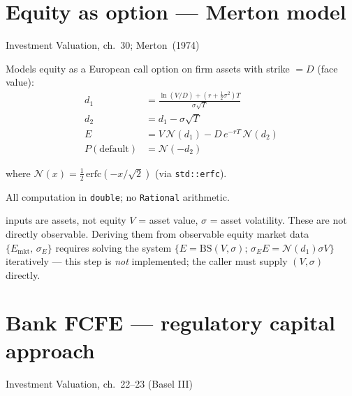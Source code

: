 \documentclass[11pt, a4paper, oneside]{article}
\begin{document}
\section{Equity as option --- Merton model}
\label{sec:distress}

\begin{damodaran}{Investment Valuation, ch.~30; Merton~(1974)}
\end{damodaran}

Models equity as a European call option on firm assets with strike $= D$ (face value):
\begin{align}
  d_1 &= \frac{\ln(V/D) + (r + \tfrac{1}{2}\sigma^2)T}{\sigma\sqrt{T}}
  \label{eq:d1}\\
  d_2 &= d_1 - \sigma\sqrt{T}
  \label{eq:d2}\\
  E &= V\,\mathcal{N}(d_1) - D\,e^{-rT}\,\mathcal{N}(d_2)
  \label{eq:merton_equity}\\
  P(\text{default}) &= \mathcal{N}(-d_2)
  \label{eq:pdefault}
\end{align}

where $\mathcal{N}(x) = \tfrac{1}{2}\,\mathrm{erfc}(-x/\sqrt{2})$
(via \texttt{std::erfc}).

All computation in \texttt{double}; no \texttt{Rational} arithmetic.

\begin{impl}{inputs are assets, not equity}
$V$ = asset value, $\sigma$ = asset volatility. These are not directly
observable. Deriving them from observable equity market data
$\{E_\text{mkt},\, \sigma_E\}$ requires solving the system
$\{E = \text{BS}(V,\sigma); \, \sigma_E E = \mathcal{N}(d_1)\sigma V\}$
iteratively --- this step is \emph{not} implemented; the caller must
supply $(V, \sigma)$ directly.
\end{impl}

\section{Bank FCFE --- regulatory capital approach}
\label{sec:bank}

\begin{damodaran}{Investment Valuation, ch.~22--23 (Basel III)}
\end{damodaran}
\end{document}
